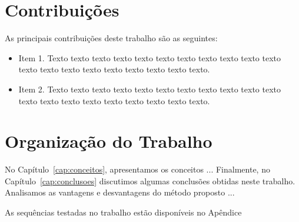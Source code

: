 \section{Contribuições}
\label{sec:contribucoes}

As principais contribuições deste trabalho são as seguintes:

\begin{itemize}
  \item Item 1. Texto texto texto texto texto texto texto texto texto texto
  texto texto texto texto texto texto texto texto texto texto.

  \item Item 2. Texto texto texto texto texto texto texto texto texto texto
  texto texto texto texto texto texto texto texto texto texto.

\end{itemize}

\section{Organização do Trabalho}
\label{sec:organizacao_trabalho}

No Capítulo~\ref{cap:conceitos}, apresentamos os conceitos ... Finalmente, no
Capítulo~\ref{cap:conclusoes} discutimos algumas conclusões obtidas neste
trabalho. Analisamos as vantagens e desvantagens do método proposto ...

As sequências testadas no trabalho estão disponíveis no Apêndice
